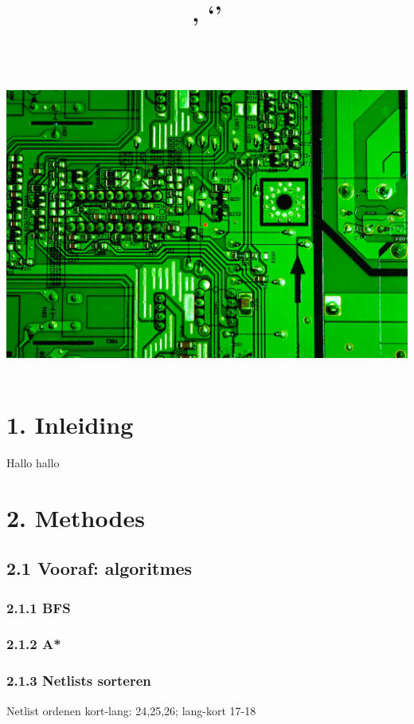 \documentclass{article}
\title{
	\vfill
	\textmd{\textbf{\hmwkTitle}}\\
	\vspace{0.1in}\large{\textit{\hmwkAuthorName}} \\
	\normalsize\vspace{0.1in}\small{\hmwkClass, `\hmwkClassTime'\\ \hmwkClassInstructor\\ \hmwkDueDate} \\
	\vfill
	\includegraphics[width=0.85\columnwidth]{Circuit-board}
	\vfill
}
\date{} %
\begin{document}
	
	\maketitle
	
	
	
	\newpage
	\renewcommand{\cftdot}{.}
	\renewcommand{\contentsname}{INHOUDSOPGAVE}
	\tableofcontents
	\newpage
	
	

	\section{1. Inleiding}
	
	Hallo hallo
	
	\section{2. Methodes}
	
	\subsection{2.1 Vooraf: algoritmes}
	
	\subsubsection{2.1.1 BFS}
	
	\subsubsection{2.1.2 A*}
	
	\subsubsection{2.1.3 Netlists sorteren}
	Netlist ordenen kort-lang: 24,25,26; lang-kort 17-18
	
\end{document}
